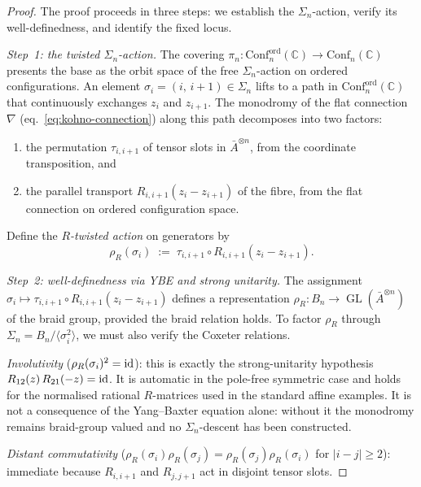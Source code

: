 \begin{proof}
The proof proceeds in three steps: we establish the
$\Sigma_n$-action, verify its well-definedness, and identify
the fixed locus.

\emph{Step~1: the twisted $\Sigma_n$-action.}
The covering $\pi_n\colon\mathrm{Conf}_n^{\mathrm{ord}}(\mathbb{C})
\to\mathrm{Conf}_n(\mathbb{C})$ presents the base as the orbit space
of the free $\Sigma_n$-action on ordered configurations. An element
$\sigma_i=(i,\,i{+}1)\in\Sigma_n$ lifts to a path in
$\mathrm{Conf}_n^{\mathrm{ord}}(\mathbb{C})$ that continuously
exchanges $z_i$ and $z_{i+1}$. The monodromy of the flat connection
$\nabla$ (eq.~\eqref{eq:kohno-connection}) along this path decomposes
into two factors:
\begin{enumerate}[label=(\roman*)]
\item the permutation $\tau_{i,i+1}$ of tensor slots in
 $\bar A^{\otimes n}$, from the coordinate transposition, and
\item the parallel transport $R_{i,i+1}(z_i-z_{i+1})$ of the fibre,
 from the flat connection on ordered configuration space.
\end{enumerate}
Define the \emph{$R$-twisted action} on generators by
\begin{equation}\label{eq:r-twisted-action}
\rho_R(\sigma_i)
\;:=\;
\tau_{i,i+1}\circ R_{i,i+1}(z_i-z_{i+1}).
\end{equation}

\emph{Step~2: well-definedness via YBE and strong unitarity.}
The assignment
\(\sigma_i\mapsto\tau_{i,i+1}\circ R_{i,i+1}(z_i-z_{i+1})\)
defines a representation
$\rho_R\colon B_n\to\operatorname{GL}(\bar A^{\otimes n})$
of the braid group, provided the braid relation holds.
To factor $\rho_R$ through $\Sigma_n=B_n/\langle\sigma_i^2\rangle$,
we must also verify the Coxeter relations.

\emph{Involutivity} ($\rho_R(\sigma_i)^2=\mathrm{id}$):
this is exactly the strong-unitarity hypothesis
$R_{12}(z)\,R_{21}(-z)=\mathrm{id}$. It is automatic in the pole-free
symmetric case and holds for the normalised rational $R$-matrices used
in the standard affine examples. It is not a consequence of the Yang--Baxter equation alone:
without it the monodromy remains braid-group valued and no
$\Sigma_n$-descent has been constructed.

\emph{Distant commutativity}
($\rho_R(\sigma_i)\rho_R(\sigma_j)
=\rho_R(\sigma_j)\rho_R(\sigma_i)$ for $|i-j|\geq 2$):
immediate because $R_{i,i+1}$ and $R_{j,j+1}$ act in disjoint
tensor slots.


\end{proof}
